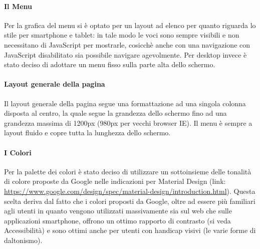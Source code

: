 \paragraph*{Il Menu}
Per la grafica del menu si è optato per un layout ad elenco per quanto riguarda lo stile per smartphone e tablet: in tale modo le voci sono sempre visibili e non necessitano di JavaScript per mostrarle, cosicch\`e anche con una navigazione con JavaScript disabilitato sia possibile navigare agevolmente.
Per desktop invece è stato deciso di adottare un menu fisso sulla parte alta dello schermo.

\paragraph*{Layout generale della pagina}
Il layout generale della pagina segue una formattazione ad una singola colonna disposta al centro, la quale segue la grandezza dello schermo fino ad una grandezza massima di 1200px (980px per vecchi browser IE).
Il menu è sempre a layout fluido e copre tutta la lunghezza dello schermo.

\paragraph*{I Colori}
Per la palette dei colori è stato deciso di utilizzare un sottoinsieme delle tonalità di colore proposte da Google nelle indicazioni per Material Design (link:  \url{https://www.google.com/design/spec/material-design/introduction.html}). Questa scelta deriva dal fatto che i colori proposti da Google, oltre ad essere più familiari agli utenti in quanto vengono utilizzati massivamente sia sul web che sulle applicazioni smartphone, offrono un ottimo rapporto di contrasto (si veda Accessibilità) e sono ottimi anche per utenti con handicap visivi (le varie forme di daltonismo).
